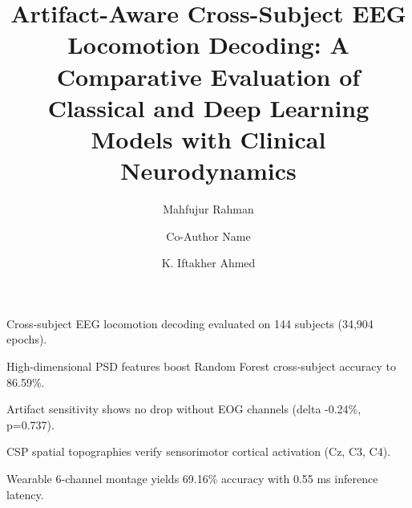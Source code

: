 \documentclass[review,12pt]{elsarticle}
\begin{document}
\begin{frontmatter}

\title{Artifact-Aware Cross-Subject EEG Locomotion Decoding: A Comparative Evaluation of Classical and Deep Learning Models with Clinical Neurodynamics}

\author[inst1]{Mahfujur Rahman}

\author[inst1]{Co-Author Name}

\author[inst1]{K. Iftakher Ahmed}



\begin{highlights}
\item Cross-subject EEG locomotion decoding evaluated on 144 subjects (34,904 epochs).
\item High-dimensional PSD features boost Random Forest cross-subject accuracy to 86.59\%.
\item Artifact sensitivity shows no drop without EOG channels (delta -0.24\%, p=0.737).
\item CSP spatial topographies verify sensorimotor cortical activation (Cz, C3, C4).
\item Wearable 6-channel montage yields 69.16\% accuracy with 0.55 ms inference latency.
\end{highlights}


\end{frontmatter}
\end{document}

